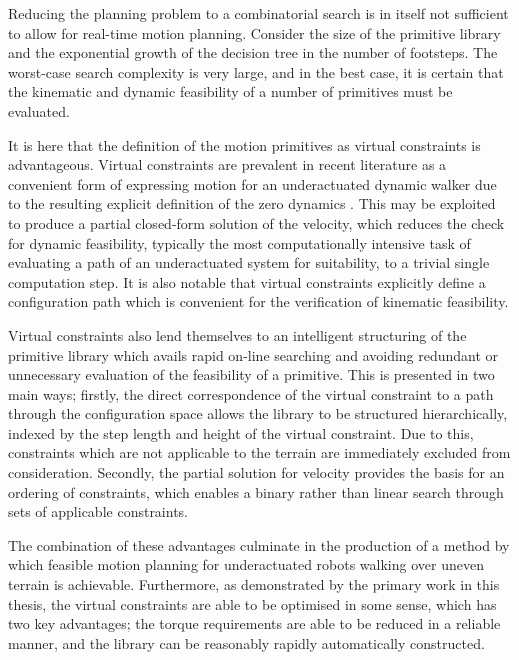 Reducing the planning problem to a combinatorial search is in itself not sufficient to allow for real-time motion planning. Consider the size of the primitive library and the exponential growth of the decision tree in the number of footsteps. The worst-case search complexity is very large, and in the best case, it is certain that the kinematic and dynamic feasibility of a number of primitives must be evaluated.

It is here that the definition of the motion primitives as virtual constraints is advantageous. Virtual constraints are prevalent in recent literature as a convenient form of expressing motion for an underactuated dynamic walker due to the resulting explicit definition of the zero dynamics \cite{westervelt2003hybrid, sreenath2011compliant, martin2014design}. This may be exploited to produce a partial closed-form solution of the velocity, which reduces the check for dynamic feasibility, typically the most computationally intensive task of evaluating a path of an underactuated system for suitability, to a trivial single computation step. It is also notable that virtual constraints explicitly define a configuration path which is convenient for the verification of kinematic feasibility.

Virtual constraints also lend themselves to an intelligent structuring of the primitive library which avails rapid on-line searching and avoiding redundant or unnecessary evaluation of the feasibility of a primitive. This is presented in two main ways; firstly, the direct correspondence of the virtual constraint to a path through the configuration space allows the library to be structured hierarchically, indexed by the step length and height of the virtual constraint. Due to this, constraints which are not applicable to the terrain are immediately excluded from consideration. Secondly, the partial solution for velocity provides the basis for an ordering of constraints, which enables a binary rather than linear search through sets of applicable constraints. 

The combination of these advantages culminate in the production of a method by which feasible motion planning for underactuated robots walking over uneven terrain is achievable. Furthermore, as demonstrated by the primary work in this thesis, the virtual constraints are able to be optimised in some sense, which has two key advantages; the torque requirements are able to be reduced in a reliable manner, and the library can be reasonably rapidly automatically constructed.

